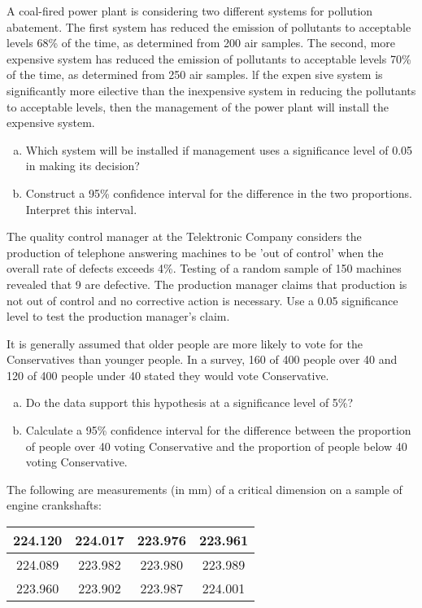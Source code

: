 
\item 
A coal-fired power plant is considering two different systems for pollution abatement.
The first system has reduced the emission of pollutants to acceptable levels 68\% of the time,
as determined from 200 air samples. The second, more expensive system has reduced the
emission of
pollutants to acceptable levels 70\% of the time, as determined from 250 air samples. lf the
expen sive system is significantly more eilective than the inexpensive system in reducing the
pollutants to acceptable levels, then the management of the power plant will install the
expensive system.

\begin{enumerate}[(a)]
\item Which system will be installed if management uses a significance level of 0.05 in making
its decision?
\item Construct a 95\% confidence interval for the difference in the two proportions. Interpret
this interval.
\end{enumerate}


\item  
The quality control manager at the Telektronic Company considers the production of telephone answering machines to be ’out of control’ when the overall rate of defects exceeds 4\%. 
Testing of a random sample of 150 machines revealed that 9 are defective. The production manager claims that production is not out of control and no corrective action is necessary. Use a 0.05 significance level to test the production manager’s claim.

\item 
It is generally assumed that older people are more likely to vote for the Conservatives than younger people. In a survey, 160 of 400 people over 40 and 120 of 400 people under 40 stated they would vote Conservative. 
\begin{enumerate}[(a)]
\item Do the data support this hypothesis at a significance level of 5\%?
\item Calculate a 95\% confidence interval for the difference between the proportion of people over 40 voting Conservative and the proportion of people below 40 voting Conservative. 
\end{enumerate}
\item The following are measurements (in mm) of a critical
dimension on a sample of engine crankshafts:
\begin{center}
\begin{tabular}{|c|c|c|c|} \hline
224.120 & 224.017 & 223.976 & 223.961 \\ \hline
224.089 & 223.982 & 223.980 & 223.989  \\ \hline
223.960 & 223.902  & 223.987 & 224.001  \\ \hline
\end{tabular}
\end{center}

